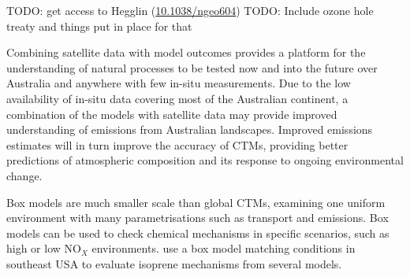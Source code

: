       TODO: get access to Hegglin (\url{10.1038/ngeo604}) \citep{Hegglin2009}
      TODO: Include ozone hole treaty and things put in place for that
      
      Combining satellite data with model outcomes provides a platform for the understanding of natural processes to be tested now and into the future over Australia and anywhere with few in-situ measurements.
      Due to the low availability of in-situ data covering most of the Australian continent, a combination of the models with satellite data may provide improved understanding of emissions from Australian landscapes.
      Improved emissions estimates will in turn improve the accuracy of CTMs, providing better predictions of atmospheric composition and its response to ongoing environmental change.
      
      Box models are much smaller scale than global CTMs, examining one uniform environment with many parametrisations such as transport and emissions.
      Box models can be used to check chemical mechanisms in specific scenarios, such as high or low NO$_X$ environments.
      \cite{Marvin2017} use a box model matching conditions in southeast USA to evaluate isoprene mechanisms from several models.
      
